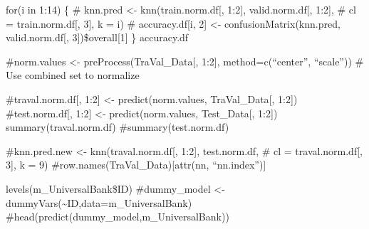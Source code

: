 \documentclass[
]{article}
\begin{document}
for(i in 1:14) \{ \# knn.pred \textless- knn(train.norm.df{[}, 1:2{]},
valid.norm.df{[}, 1:2{]}, \# cl = train.norm.df{[}, 3{]}, k = i) \#
accuracy.df{[}i, 2{]} \textless- confusionMatrix(knn.pred,
valid.norm.df{[}, 3{]})\$overall{[}1{]} \} accuracy.df

\#norm.values \textless- preProcess(TraVal\_Data{[}, 1:2{]},
method=c(``center'', ``scale'')) \# Use combined set to normalize

\#traval.norm.df{[}, 1:2{]} \textless- predict(norm.values,
TraVal\_Data{[}, 1:2{]}) \#test.norm.df{[}, 1:2{]} \textless-
predict(norm.values, Test\_Data{[}, 1:2{]}) summary(traval.norm.df)
\#summary(test.norm.df)

\#knn.pred.new \textless- knn(traval.norm.df{[}, 1:2{]}, test.norm.df,
\# cl = traval.norm.df{[}, 3{]}, k = 9)
\#row.names(TraVal\_Data){[}attr(nn, ``nn.index''){]}

levels(m\_UniversalBank\$ID) \#dummy\_model \textless-
dummyVars(\textasciitilde ID,data=m\_UniversalBank)
\#head(predict(dummy\_model,m\_UniversalBank))
\end{document}
